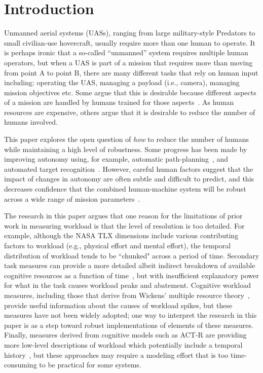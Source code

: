 \section{Introduction}

Unmanned aerial systems (UASs), ranging from large military-style Predators to small civilian-use hovercraft, usually require more than one human to operate.  It is perhaps ironic that a so-called ``unmanned'' system requires multiple human operators, but when a UAS is part of a mission that requires more than moving from point A to point B, there are many different tasks that rely on human input including: operating the UAS, managing a payload (i.e., camera), managing mission objectives etc.  Some argue that this is desirable because different aspects of a mission are handled by humans trained for those aspects~\cite{MurphyBurke2010}. As human resources are expensive, others argue that it is desirable to reduce the number of humans involved.

This paper explores the open question of {\em how} to reduce the number of humans while maintaining a high level of robustness.  Some progress has been made by improving autonomy using, for example, automatic path-planning~\cite{WongBourgaultFurukawa2005,878915,pettersson2006probabilistic,QuigleyBarberEtAl2005,NelsonBarberMcLainBeard2006}, and automated target recognition~\cite{MorseEnghGoodrich2010,dasgupta2008multiagent,barber2006vision}. However, careful human factors suggest that the impact of changes in autonomy are often subtle and difficult to predict, and this decreases confidence that the combined human-machine system will be robust across a wide range of mission parameters~\cite{KaberEndsley2004,chen2011supervisory,chen2007human}.

The research in this paper argues that one reason for the limitations of prior work in measuring workload is that the level of resolution is too detailed.  For example, although the NASA TLX dimensions include various contributing factors to workload (e.g., physical effort and mental effort), the temporal distribution of workload tends to be ``chunked" across a period of time.  Secondary task measures can provide a more detailed albeit indirect breakdown of available cognitive resources as a function of time~\cite{kaber1999adaptive}, but with insufficient explanatory power for what in the task causes workload peaks and abatement.  Cognitive workload measures, including those that derive from Wickens' multiple resource theory~\cite{wickens2002multiple}, provide useful information about the causes of workload spikes, but these measures have not been widely adopted; one way to interpret the research in this paper is as a step toward robust implementations of elements of these measures.  Finally, measures derived from cognitive models such as ACT-R are providing more low-level descriptions of workload which potentially include a temporal history~\cite{lebiere2013cognitive}, but these approaches may require a modeling effort that is too time-consuming to be practical for some systems.

